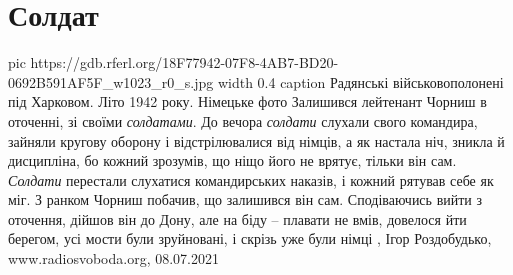  
 
 
 
 
\chapter{Солдат}
\label{sec:slova.soldat}

\ifcmt
  pic https://gdb.rferl.org/18F77942-07F8-4AB7-BD20-0692B591AF5F_w1023_r0_s.jpg
	width 0.4
	caption Радянські військовополонені під Харковом. Літо 1942 року. Німецьке фото
\fi
Залишився лейтенант Чорниш в оточенні, зі своїми \emph{солдатами}. До вечора \emph{солдати}
слухали свого командира, зайняли кругову оборону і відстрілювалися від німців,
а як настала ніч, зникла й дисципліна, бо кожний зрозумів, що ніщо його не
врятує, тільки він сам. \emph{Солдати} перестали слухатися командирських наказів, і
кожний рятував себе як міг. З ранком Чорниш побачив, що залишився він сам.
Сподіваючись вийти з оточення, дійшов він до Дону, але на біду – плавати не
вмів, довелося йти берегом, усі мости були зруйновані, і скрізь уже були німці
, 
Ігор Роздобудько, www.radiosvoboda.org, 08.07.2021
